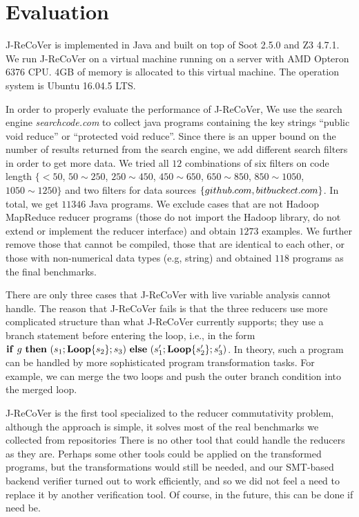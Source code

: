\documentclass{llncs}
\newcommand{\ite}[3]{
	 \ifmmode
	 \mathbf{if}\ #1 \ \mathbf{then}\ #2\  \mathbf{else}\ #3
	 \else
	 \textbf{if}\ #1 \ \textbf{then}\ #2\  \textbf{else}\ #3
	 \fi}
\newcommand{\rloop}{
	\ifmmode
	\mathbf{Loop}
	\else
	\textbf{Loop}
	\fi}
\begin{document}
\section{Evaluation} \label{section:exp}

J-ReCoVer is implemented in Java and built on top of Soot 2.5.0 and Z3 4.7.1. We run J-ReCoVer on a virtual machine running on a server with AMD Opteron 6376 CPU. 4GB of memory is allocated to this virtual machine. The operation system is Ubuntu 16.04.5 LTS. 

In order to properly evaluate the performance of J-ReCoVer, We use the search engine \emph{searchcode.com} to collect java programs containing the key strings ``public void reduce'' or ``protected void reduce''. Since there is an upper bound on the number of results returned from the search engine, we add different search filters in order to get more data. We tried all $12$ combinations of six filters on code length $\{<50$, $ 50\sim 250$, $250\sim 450$, $450\sim 650$, $650\sim 850$, $850\sim 1050$, $1050\sim 1250\}$
and two filters for data sources $\{github.com, bitbuckect.com\}$. In total, we get $11346$ Java programs. We exclude cases that are not Hadoop MapReduce reducer programs (those do not import the Hadoop library, do not extend or implement the reducer interface) and obtain $1273$ examples. We further remove those that cannot be compiled, those that are identical to each other, or those with non-numerical data types (e.g, string) and obtained $118$ programs as the final benchmarks.

There are only three cases that J-ReCoVer with live variable analysis cannot handle. The reason that J-ReCoVer fails is that the three reducers use more complicated structure than what J-ReCoVer currently supports; they use a branch statement before entering the loop, i.e., in the form $\ite{g}{(s_1;\rloop\{s_2\};s_3)}{(s'_1;\rloop\{s'_2\};s'_3)}$. In theory, such a program can be handled by more sophisticated program transformation tasks. For example, we can merge the two loops and push the outer branch condition into the merged loop.

J-ReCoVer is the first tool specialized to the reducer commutativity problem, although the approach is simple, it solves most of the real benchmarks we collected from repositories
There is no other tool that could handle the reducers as they are. Perhaps some other tools could be applied on the transformed programs, but the transformations would still be needed, and our SMT-based backend verifier turned out to work efficiently, and so we did not feel a need to replace it by another verification tool. Of course, in the future, this can be done if need be.
\end{document}
